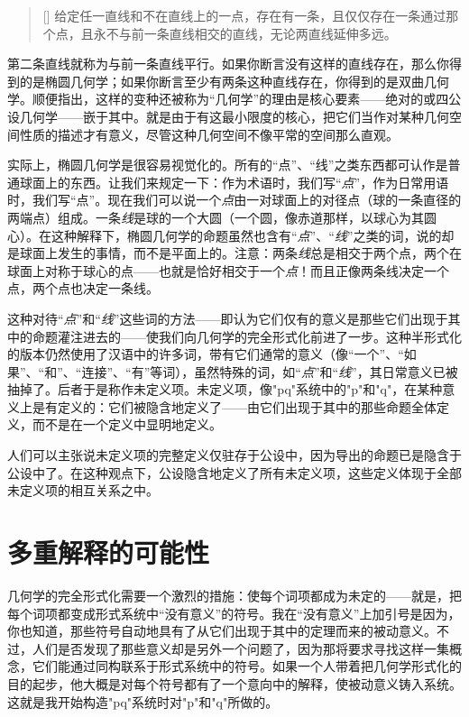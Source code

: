 \begin{quote}[]
给定任一直线和不在直线上的一点，存在有一条，且仅仅存在一条通过那个点，且永不与前一条直线相交的直线，无论两直线延伸多远。
\end{quote}

第二条直线就称为与前一条直线平行。如果你断言没有这样的直线存在，那么你得到的是椭圆几何学；如果你断言至少有两条这种直线存在，你得到的是双曲几何学。顺便指出，这样的变种还被称为“几何学”的理由是核心要素——绝对的或四公设几何学——嵌于其中。就是由于有这最小限度的核心，把它们当作对某种几何空间性质的描述才有意义，尽管这种几何空间不像平常的空间那么直观。

实际上，椭圆几何学是很容易视觉化的。所有的“点”、“线”之类东西都可认作是普通球面上的东西。让我们来规定一下：作为术语时，我们写“\emph{点}”，作为日常用语时，我们写“点”。现在我们可以说一个\emph{点}由一对球面上的对径点（球的一条直径的两端点）组成。一条\emph{线}是球的一个大圆（一个圆，像赤道那样，以球心为其圆心）。在这种解释下，椭圆几何学的命题虽然也含有“\emph{点}”、“\emph{线}”之类的词，说的却是球面上发生的事情，而不是平面上的。注意：两条\emph{线}总是相交于两个点，两个在球面上对称于球心的点——也就是恰好相交于一个\emph{点}！而且正像两条线决定一个点，两个点也决定一条线。

这种对待“\emph{点}”和“\emph{线}”这些词的方法——即认为它们仅有的意义是那些它们出现于其中的命题灌注进去的——使我们向几何学的完全形式化前进了一步。这种半形式化的版本仍然使用了汉语中的许多词，带有它们通常的意义（像“一个”、“如果”、“和”、“连接”、“有”等词），虽然特殊的词，如“\emph{点}”和“\emph{线}”，其日常意义已被抽掉了。后者于是称作未定义项。未定义项，像"pq"系统中的"p"和"q"，在某种意义上是有定义的：它们被隐含地定义了——由它们出现于其中的那些命题全体定义，而不是在一个定义中显明地定义。

人们可以主张说未定义项的完整定义仅驻存于公设中，因为导出的命题已是隐含于公设中了。在这种观点下，公设隐含地定义了所有未定义项，这些定义体现于全部未定义项的相互关系之中。

\section{多重解释的可能性}

几何学的完全形式化需要一个激烈的措施：使每个词项都成为未定的——就是，把每个词项都变成形式系统中“没有意义”的符号。我在“没有意义”上加引号是因为，你也知道，那些符号自动地具有了从它们出现于其中的定理而来的被动意义。不过，人们是否发现了那些意义却是另外一个问题了，因为那将要求寻找这样一集概念，它们能通过同构联系于形式系统中的符号。如果一个人带着把几何学形式化的目的起步，他大概是对每个符号都有了一个意向中的解释，使被动意义铸入系统。这就是我开始构造"pq"系统时对"p"和"q"所做的。

